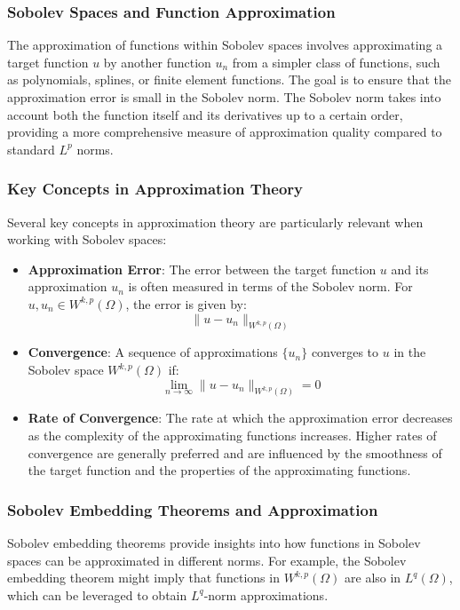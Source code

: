 \documentclass[11pt,a4paper]{article}
\begin{document}
\subsubsection{Sobolev Spaces and Function Approximation}

The approximation of functions within Sobolev spaces involves approximating a target function \(u\) by another function \(u_n\) from a simpler class of functions, such as polynomials, splines, or finite element functions. The goal is to ensure that the approximation error is small in the Sobolev norm. The Sobolev norm takes into account both the function itself and its derivatives up to a certain order, providing a more comprehensive measure of approximation quality compared to standard \(L^p\) norms.

\subsubsection{Key Concepts in Approximation Theory}

Several key concepts in approximation theory are particularly relevant when working with Sobolev spaces:
\begin{itemize}
    \item \textbf{Approximation Error}: The error between the target function \(u\) and its approximation \(u_n\) is often measured in terms of the Sobolev norm. For \(u, u_n \in W^{k,p}(\Omega)\), the error is given by:
    \[ \|u - u_n\|_{W^{k,p}(\Omega)} \]

    \item \textbf{Convergence}: A sequence of approximations \(\{u_n\}\) converges to \(u\) in the Sobolev space \(W^{k,p}(\Omega)\) if:
    \[ \lim_{n \to \infty} \|u - u_n\|_{W^{k,p}(\Omega)} = 0 \]

    \item \textbf{Rate of Convergence}: The rate at which the approximation error decreases as the complexity of the approximating functions increases. Higher rates of convergence are generally preferred and are influenced by the smoothness of the target function and the properties of the approximating functions.
\end{itemize}

\subsubsection{Sobolev Embedding Theorems and Approximation}

Sobolev embedding theorems provide insights into how functions in Sobolev spaces can be approximated in different norms. For example, the Sobolev embedding theorem might imply that functions in \(W^{k,p}(\Omega)\) are also in \(L^q(\Omega)\), which can be leveraged to obtain \(L^q\)-norm approximations.
\end{document}
